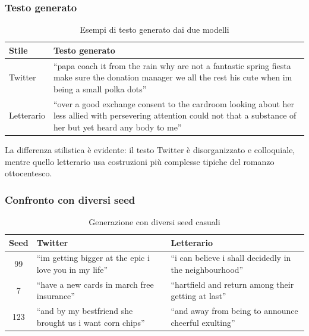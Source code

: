\documentclass[12pt, a4paper]{article}
\begin{document}
\subsubsection{Testo generato}

\begin{table}[H]
\centering
\begin{tabular}{p{2cm}p{10cm}}
\toprule
\textbf{Stile} & \textbf{Testo generato} \\
\midrule
Twitter &
``papa coach it from the rain why are not a fantastic spring
fiesta make sure the donation manager we all the rest his cute
when im being a small polka dots'' \\
\midrule
Letterario &
``over a good exchange consent to the cardroom looking about
her less allied with persevering attention could not that a
substance of her but yet heard any body to me'' \\
\bottomrule
\end{tabular}
\caption{Esempi di testo generato dai due modelli}
\end{table}

La differenza stilistica è evidente: il testo Twitter è disorganizzato
e colloquiale, mentre quello letterario usa costruzioni più complesse
tipiche del romanzo ottocentesco.

\subsubsection{Confronto con diversi seed}

\begin{table}[H]
\centering
\begin{tabular}{cp{5cm}p{5cm}}
\toprule
\textbf{Seed} & \textbf{Twitter} & \textbf{Letterario} \\
\midrule
99  & ``im getting bigger at the epic i love you in my life'' &
      ``i can believe i shall decidedly in the neighbourhood'' \\
7   & ``have a new cards in march free insurance'' &
      ``hartfield and return among their getting at last'' \\
123 & ``and by my bestfriend she brought us i want corn chips'' &
      ``and away from being to announce cheerful exulting'' \\
\bottomrule
\end{tabular}
\caption{Generazione con diversi seed casuali}
\end{table}

\end{document}
